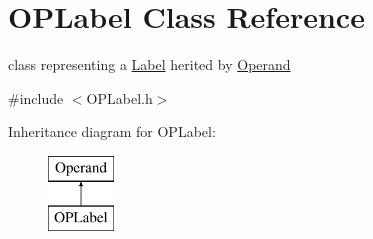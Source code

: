 \hypertarget{class_o_p_label}{}\section{O\+P\+Label Class Reference}
\label{class_o_p_label}


class representing a \mbox{\hyperlink{class_label}{Label}} herited by \mbox{\hyperlink{class_operand}{Operand}}  




{\ttfamily \#include $<$O\+P\+Label.\+h$>$}

Inheritance diagram for O\+P\+Label\+:\begin{figure}[H]
\begin{center}
\leavevmode
\includegraphics[height=2.000000cm]{class_o_p_label}
\end{center}
\end{figure}
